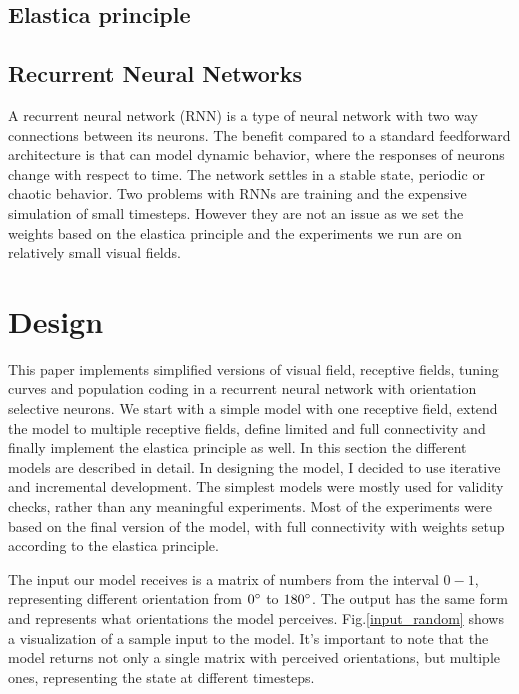 \section{Elastica principle}






\section{Recurrent Neural Networks}

A recurrent neural network (RNN) is a type of neural network with two way connections between its neurons. The benefit compared to a standard feedforward architecture is that can model dynamic behavior, where the responses of neurons change with respect to time. The network settles in a stable state, periodic or chaotic behavior. Two problems with RNNs are training and the expensive simulation of small timesteps. However they are not an issue as we set the weights based on the elastica principle and the experiments we run are on relatively small visual fields.

\chapter{Design}

This paper implements simplified versions of visual field, receptive fields, tuning curves and population coding in a recurrent neural network with orientation selective neurons. We start with a simple model with one receptive field, extend the model to multiple receptive fields, define limited and full connectivity and finally implement the elastica principle as well. In this section the different models are described in detail. In designing the model, I decided to use iterative and incremental development. The simplest models were mostly used for validity checks, rather than any meaningful experiments. Most of the experiments were based on the final version of the model, with full connectivity with weights setup according to the elastica principle.  

The input our model receives is a matrix of numbers from the interval $0-1$, representing different orientation from $0\degree$ to $180\degree$. The output has the same form and represents what orientations the model perceives. Fig.\ref{input_random} shows a visualization of a sample input to the model. It's important to note that the model returns not only a single matrix with perceived orientations, but multiple ones, representing the state at different timesteps.


